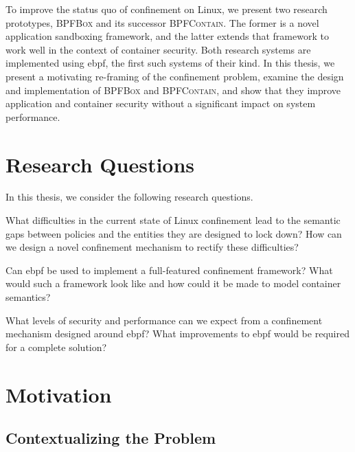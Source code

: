 \documentclass[
  fontsize=12pt,
  titlepage=firstiscover,
  paper=letter,
oneside,
  cleardoublepage=plain,
  parskip=half-,
  DIV=10,
  parindent,
  appendixprefix,
  chapterprefix,
  listof=totoc,
]{scrbook}
\newcommand{\bpfbox}{\textsc{BPFBox}}
\newcommand{\bpfcontain}{\textsc{BPFContain}}
\begin{document}
To improve the status quo of confinement on Linux, we present two research prototypes,
\bpfbox{} and its successor \bpfcontain{}. The former is a novel application sandboxing
framework, and the latter extends that framework to work well in the context of container
security. Both research systems are implemented using \gls{ebpf}, the first such systems
of their kind. In this thesis, we present a motivating re-framing of the confinement
problem, examine the design and implementation of \bpfbox{} and \bpfcontain{}, and show
that they improve application and container security without a significant impact on
system performance.



\section{Research Questions}\label{s:intro-rqs}

In this thesis, we consider the following research questions.

\begin{rqenum}
  \item \label{rq1} What difficulties in the current state of Linux confinement lead to the semantic
        gaps between policies and the entities they are designed to lock down? How can we design
        a novel confinement mechanism to rectify these difficulties?

  \item \label{rq2} Can \gls{ebpf} be used to implement a full-featured confinement framework?
        What would such a framework look like and how could it be made to model container semantics?

  \item \label{rq3} What levels of security and performance can we expect from a confinement mechanism
        designed around \gls{ebpf}? What improvements to \gls{ebpf} would be required for
        a complete solution?
\end{rqenum}

\section{Motivation}\label{s:motivation}

\subsection{Contextualizing the Problem}\label{ss:contextualizing-the-problem}
\end{document}
